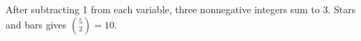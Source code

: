 After subtracting 1 from each variable, three nonnegative integers sum to 3. Stars and bars gives $\binom52=\boxed{10}$.
